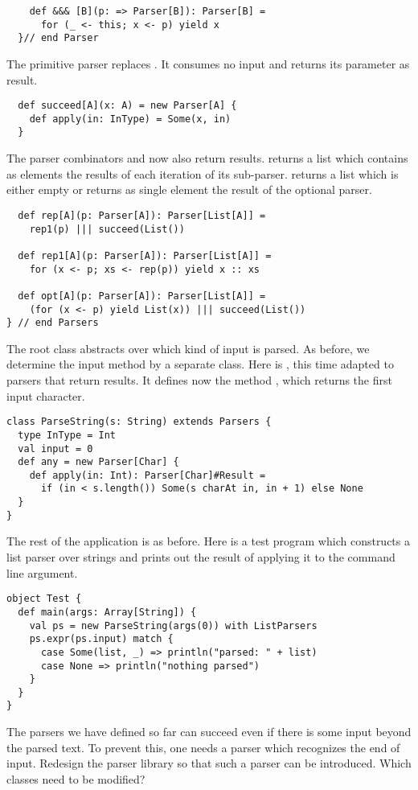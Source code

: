 {\begin{lstlisting}
    def &&& [B](p: => Parser[B]): Parser[B] =
      for (_ <- this; x <- p) yield x
  }// end Parser
\end{lstlisting}

The primitive parser  replaces . It consumes
no input and returns its parameter as result.
\begin{lstlisting}
  def succeed[A](x: A) = new Parser[A] {
    def apply(in: InType) = Some(x, in)
  }
\end{lstlisting}

The parser combinators  and  now also return
results.  returns a list which contains as elements the
results of each iteration of its sub-parser.  returns a list
which is either empty or returns as single element the result of the
optional parser.
\begin{lstlisting}
  def rep[A](p: Parser[A]): Parser[List[A]] =
    rep1(p) ||| succeed(List())

  def rep1[A](p: Parser[A]): Parser[List[A]] =
    for (x <- p; xs <- rep(p)) yield x :: xs

  def opt[A](p: Parser[A]): Parser[List[A]] =
    (for (x <- p) yield List(x)) ||| succeed(List())
} // end Parsers
\end{lstlisting}
The root class  abstracts over which kind of
input is parsed.  As before, we determine the input method by a separate class.
Here is , this time adapted to parsers that return results.
It defines now the method , which returns the first input character.
\begin{lstlisting}
class ParseString(s: String) extends Parsers {
  type InType = Int
  val input = 0
  def any = new Parser[Char] {
    def apply(in: Int): Parser[Char]#Result =
      if (in < s.length()) Some(s charAt in, in + 1) else None
  }
}
\end{lstlisting}
The rest of the application is as before. Here is a test program which
constructs a list parser over strings and prints out the result of
applying it to the command line argument.
\begin{lstlisting}
object Test {
  def main(args: Array[String]) {
    val ps = new ParseString(args(0)) with ListParsers
    ps.expr(ps.input) match {
      case Some(list, _) => println("parsed: " + list)
      case None => println("nothing parsed")
    }
  }
}
\end{lstlisting}

\begin{exercise}\label{exercise:end-marker} The parsers we have defined so
far can succeed even if there is some input beyond the parsed text. To
prevent this, one needs a parser which recognizes the end of input.
Redesign the parser library so that such a parser can be introduced.
Which classes need to be modified?
\end{exercise}
}

